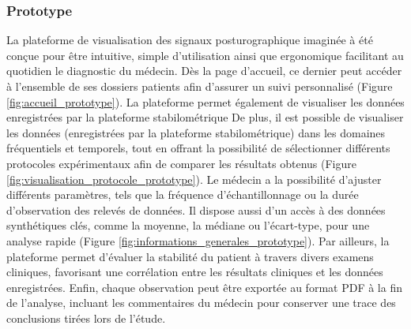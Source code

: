 \subsubsection{Prototype}
La plateforme de visualisation des signaux posturographique imaginée à été conçue 
pour être intuitive, simple d’utilisation ainsi que ergonomique facilitant au 
quotidien le diagnostic du médecin. Dès la page d’accueil, ce dernier peut accéder 
à l’ensemble de ses dossiers patients afin d’assurer un suivi personnalisé 
(Figure \ref{fig:accueil_prototype}). La plateforme permet également de visualiser les données 
enregistrées par la plateforme stabilométrique 
De plus, il est possible de visualiser les données 
(enregistrées par la plateforme stabilométrique) dans les domaines fréquentiels 
et temporels, tout en offrant la possibilité de sélectionner différents protocoles 
expérimentaux afin de comparer les résultats obtenus (Figure \ref{fig:visualisation_protocole_prototype}). 
Le médecin a la possibilité d’ajuster différents paramètres, tels que la fréquence 
d’échantillonnage ou la durée d’observation des relevés de données.  Il dispose 
aussi d’un accès à des données synthétiques clés, comme la moyenne, la médiane ou 
l’écart-type, pour une analyse rapide (Figure \ref{fig:informations_generales_prototype}). Par ailleurs, la plateforme 
permet d’évaluer la stabilité du patient à travers divers examens cliniques, 
favorisant une corrélation entre les résultats cliniques et les données 
enregistrées. Enfin, chaque observation peut être exportée au format PDF à la fin 
de l’analyse, incluant les commentaires du médecin pour conserver une trace des 
conclusions tirées lors de l’étude.

